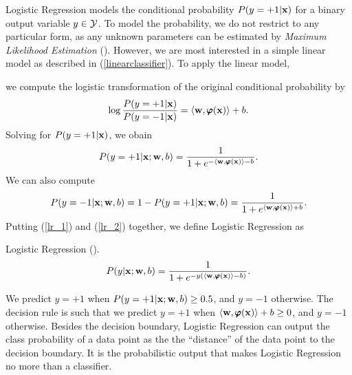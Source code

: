 {Logistic Regression models the conditional probability $P(y=+1|\mathbf {x})$ for a binary output variable $y\in\mathcal{Y}$.
To model the probability, we do not restrict to any particular form, as any unknown parameters can be estimated by \textit{Maximum Likelihood Estimation} (\mle).
However, we are most interested in a simple linear model as described in (\ref{linearclassifier}).
To apply the linear model,

we compute the logistic transformation of the original conditional probability by
\begin{align*}
	\log\frac{P(y=+1|\mathbf {x})}{P(y=-1|\mathbf {x})} = \langle \mathbf {w}, \pmb \varphi(\mathbf {x}) \rangle + b.
\end{align*}
Solving for $P(y=+1|\mathbf {x})$, we obain
\begin{align}
	P(y=+1|\mathbf {x};\mathbf {w},b) = \frac{1}{1+e^{ -\langle \mathbf {w}, \pmb \varphi(\mathbf {x}) \rangle-b }}. \label{lr_1}
\end{align}
We can also compute
\begin{align}
	P(y=-1|\mathbf {x};\mathbf {w},b)=1-P(y=+1|\mathbf {x};\mathbf {w},b)=\frac{1}{1+e^{ \langle \mathbf {w}, \pmb \varphi(\mathbf {x}) \rangle+b }}. \label{lr_2}
\end{align}
Putting (\ref{lr_1}) and (\ref{lr_2}) together, we define Logistic Regression as
\begin{definition}{Logistic Regression (\lr).} \label{logistic_regression}
	\begin{align*}
		P(y|\mathbf {x};\mathbf {w},b) = \frac{1}{1+e^{ -y(\langle \mathbf {w}, \pmb \varphi(\mathbf {x}) \rangle-b) }}.
	\end{align*}
\end{definition}
\noindent
We predict $y=+1$ when $P(y=+1|\mathbf {x};\mathbf {w},b)\ge0.5$, and $y=-1$ otherwise.
The decision rule is such that we predict $y=+1$ when $\langle \mathbf {w}, \pmb \varphi(\mathbf {x}) \rangle+b\ge0$, and $y=-1$ otherwise.
Besides the decision boundary, Logistic Regression can output the class probability of a data point as the the ``distance'' of the data point to the decision boundary.
It is the probabilistic output that makes Logistic Regression no more than a classifier.

}
